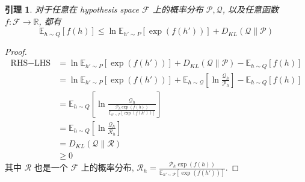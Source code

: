 \documentclass[8pt]{article}
\theoremstyle{compact}
\newtheorem{lemma}[theorem]{引理}
\def\le{\leqslant}
\def\ge{\geqslant}
\begin{document}
\begin{lemma}
	对于任意在 hypothesis space $\mathcal F$ 上的概率分布 $\mathcal P, \mathcal Q$, 以及任意函数 $f: \mathcal F \to \mathbb R$, 都有
	$$\mathbb E_{h \sim Q}[f(h)] \le \ln \mathbb E_{h' \sim P}[\exp(f(h'))] + D_{KL}(\mathcal Q \| \mathcal P)$$
	\label{PAC-Bayesian-lem-1}
\end{lemma}
\begin{proof}
	\begin{equation*}
		\begin{split}
			\text{RHS} -\text{LHS} &= \ln \mathbb E_{h' \sim P}[\exp(f(h'))] + D_{KL}(\mathcal Q \| \mathcal P) - \mathbb E_{h \sim Q}[f(h)]\\
			&= \ln \mathbb E_{h' \sim P}[\exp(f(h'))] + \mathbb E_{h \sim \mathcal Q}\left[\ln \frac{\mathcal Q_h}{\mathcal P_h}\right] - \mathbb E_{h \sim Q}[f(h)]\\
			&= \mathbb E_{h \sim Q} \left[\ln \frac{\mathcal Q_h}{\frac{\mathcal P_h \exp(f(h))}{\mathbb E_{h' \sim \mathcal P} [\exp(f(h'))]}}\right]\\
			&= \mathbb E_{h \sim Q} \left[\ln \frac{\mathcal Q_h}{\mathcal R_h}\right]\\
			&= D_{KL}(\mathcal Q \| \mathcal R)\\
			& \ge 0
		\end{split}
	\end{equation*}
	其中 $\mathcal R$ 也是一个 $\mathcal F$ 上的概率分布, $\mathcal R_h = \frac{\mathcal P_h \exp(f(h))}{\mathbb E_{h' \sim \mathcal P} [\exp(f(h'))]}$.
\end{proof}
\end{document}
